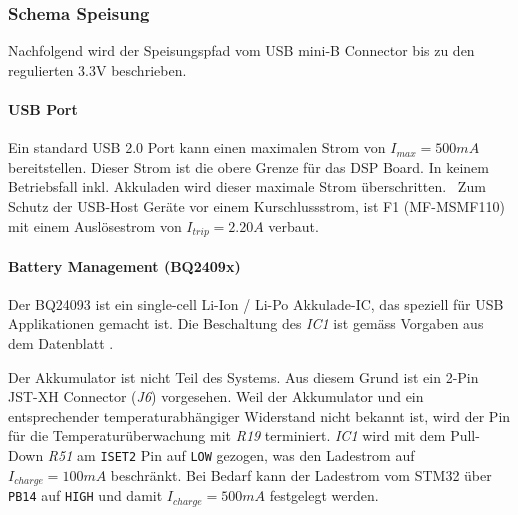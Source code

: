 \subsubsection{Schema Speisung}
\label{sec:Schema_Speisung}

Nachfolgend wird der Speisungspfad vom USB mini-B Connector bis zu den regulierten 3.3\si{V} beschrieben.

\paragraph{USB Port}

Ein standard USB 2.0 Port kann einen maximalen Strom von ${I_{max}=500\si{mA}}$ bereitstellen.
Dieser Strom ist die obere Grenze für das DSP Board. In keinem Betriebsfall inkl. Akkuladen wird dieser maximale Strom überschritten.
\
Zum Schutz der USB-Host Geräte vor einem Kurschlussstrom, ist F1 (MF-MSMF110) mit einem Auslösestrom von ${I_{trip}=2.20\si{A}}$ \cite{usb-fuse} verbaut.


\paragraph{Battery Management (BQ2409x)}

Der BQ24093 ist ein single-cell Li-Ion / Li-Po Akkulade-IC, das speziell für USB Applikationen gemacht ist.
Die Beschaltung des \textit{IC1} ist gemäss Vorgaben aus dem Datenblatt \cite{bq2409x}.

Der Akkumulator ist nicht Teil des Systems. Aus diesem Grund ist ein 2-Pin JST-XH Connector (\textit{J6}) vorgesehen.
Weil der Akkumulator und ein entsprechender temperaturabhängiger Widerstand nicht bekannt ist, 
wird der Pin für die Temperaturüberwachung mit \textit{R19} terminiert.
\textit{IC1} wird mit dem Pull-Down \textit{R51} am \texttt{ISET2} Pin auf \texttt{LOW} gezogen, was den Ladestrom auf ${I_{charge}=100\si{mA}}$ beschränkt. 
Bei Bedarf kann der Ladestrom vom STM32 über \texttt{PB14} auf \texttt{HIGH} und damit ${I_{charge}=500\si{mA}}$ festgelegt werden.


